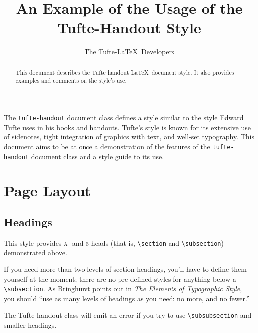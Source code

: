 \documentclass[twoside]{tufte-handout}
\title{An Example of the Usage of the Tufte-Handout Style}
\author{The Tufte-\LaTeX\ Developers}
\begin{document}
\maketitle %

\begin{abstract}
\noindent This document describes the Tufte handout \LaTeX\ document style.
It also provides examples and comments on the style's use.
\end{abstract}

The \Verb|tufte-handout| document class defines a style similar to the
style Edward Tufte uses in his books and handouts.  Tufte's style is known
for its extensive use of sidenotes, tight integration of graphics with
text, and well-set typography.  This document aims to be at once a
demonstration of the features of the \Verb|tufte-handout| document class
and a style guide to its use.

\section{Page Layout}\label{sec:page-layout}
\subsection{Headings}\label{sec:headings}
This style provides \textsc{a}- and \textsc{b}-heads (that is,
\Verb|\section| and \Verb|\subsection|) demonstrated above.

If you need more than two levels of section headings, you'll have to define
them yourself at the moment; there are no pre-defined styles for anything below a
\Verb|\subsection|.  As Bringhurst points out in \textit{The Elements of
Typographic Style},\cite{Bringhurst2005} you should ``use as many levels of
headings as you need: no more, and no fewer.''

The Tufte-handout class will emit an error if you try to use
\Verb|\subsubsection| and smaller headings.
\end{document}
